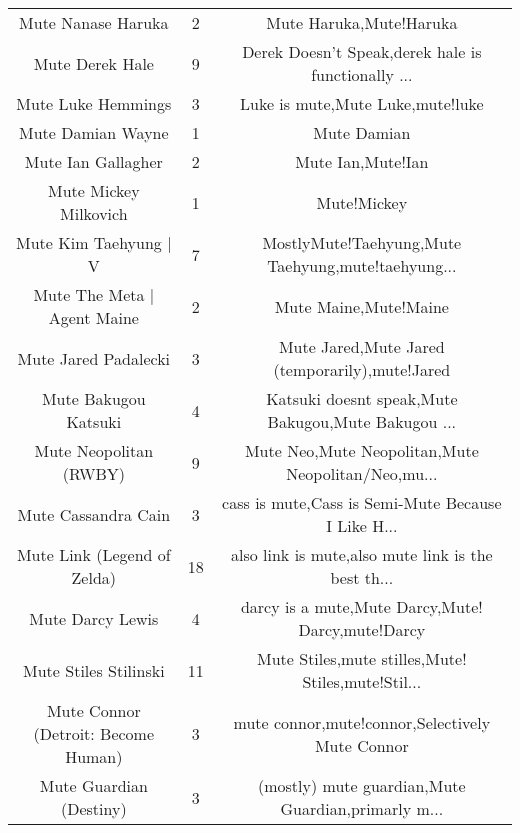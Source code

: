 \begin{table}[h!]
{\begin{tabular}{|c|c|c|}
                                Mute Nanase Haruka &      2 &                            Mute Haruka,Mute!Haruka \\
                                   Mute Derek Hale &      9 & Derek Doesn't Speak,derek hale is functionally ... \\
                                Mute Luke Hemmings &      3 &                   Luke is mute,Mute Luke,mute!luke \\
                                 Mute Damian Wayne &      1 &                                        Mute Damian \\
                                Mute Ian Gallagher &      2 &                                  Mute Ian,Mute!Ian \\
                             Mute Mickey Milkovich &      1 &                                        Mute!Mickey \\
                             Mute Kim Taehyung | V &      7 & MostlyMute!Taehyung,Mute Taehyung,mute!taehyung... \\
                       Mute The Meta | Agent Maine &      2 &                              Mute Maine,Mute!Maine \\
                              Mute Jared Padalecki &      3 &     Mute Jared,Mute Jared (temporarily),mute!Jared \\
                              Mute Bakugou Katsuki &      4 & Katsuki doesnt speak,Mute Bakugou,Mute Bakugou ... \\
                            Mute Neopolitan (RWBY) &      9 & Mute Neo,Mute Neopolitan,Mute Neopolitan/Neo,mu... \\
                               Mute Cassandra Cain &      3 & cass is mute,Cass is Semi-Mute Because I Like H... \\
                       Mute Link (Legend of Zelda) &     18 & also link is mute,also mute link is the best th... \\
                                  Mute Darcy Lewis &      4 &  darcy is a mute,Mute Darcy,Mute! Darcy,mute!Darcy \\
                             Mute Stiles Stilinski &     11 & Mute Stiles,mute stilles,Mute! Stiles,mute!Stil... \\
               Mute Connor (Detroit: Become Human) &      3 &    mute connor,mute!connor,Selectively Mute Connor \\
                           Mute Guardian (Destiny) &      3 & (mostly) mute guardian,Mute Guardian,primarly m... \\

\end{tabular}}
\end{table}

